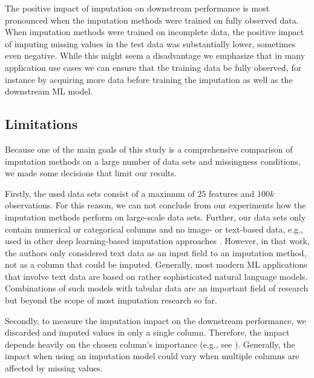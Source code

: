The positive impact of imputation on downstream performance is most pronounced when the imputation methods were trained on fully observed data. When imputation methods were trained on incomplete data, the positive impact of imputing missing values in the test data was substantially lower, sometimes even negative. While this might seem a disadvantage we emphasize that in many application use cases we can ensure that the training data be fully observed, for instance by acquiring more data before training the imputation as well as the downstream ML model.


\subsection{Limitations}
\label{sec:limitations}
%
Because one of the main goals of this study is a comprehensive comparison of imputation methods on a large number of data sets and missingness conditions, we made some decisions that limit our results.

Firstly, the used data sets consist of a maximum of $25$ features and $100k$ observations. For this reason, we can not conclude from our experiments how the imputation methods perform on large-scale data sets. Further, our data sets only contain numerical or categorical columns and no image- or text-based data, e.g., used in other deep learning-based imputation approaches \citep{Biessmann2018a}. However, in that work, the authors only considered text data as an input field to an imputation method, not as a column that could be imputed. Generally, most modern ML applications that involve text data are based on rather sophisticated natural language models. Combinations of such models with tabular data are an important field of research \citep{Yin2020} but beyond the scope of most imputation research so far.

Secondly, to measure the imputation impact on the downstream performance, we discarded and imputed values in only a single column. Therefore, the impact depends heavily on the chosen column's importance (e.g., see \cite{Jenga}). Generally, the impact when using an imputation model could vary when multiple columns are affected by missing values.
